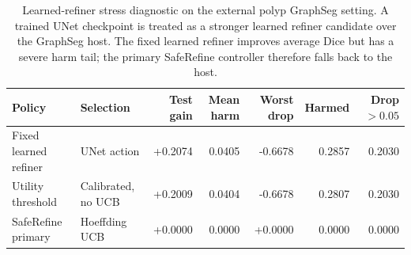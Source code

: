 \begin{table}[t]
\centering
\caption{Learned-refiner stress diagnostic on the external polyp GraphSeg setting. A trained UNet checkpoint is treated as a stronger learned refiner candidate over the GraphSeg host. The fixed learned refiner improves average Dice but has a severe harm tail; the primary SafeRefine controller therefore falls back to the host.}
\label{tab:learned_refiner_pair}
\begin{tabular}{llrrrrr}
\toprule
Policy & Selection & Test gain & Mean harm & Worst drop & Harmed & Drop$>0.05$ \\
\midrule
Fixed learned refiner & UNet action & +0.2074 & 0.0405 & -0.6678 & 0.2857 & 0.2030 \\
Utility threshold & Calibrated, no UCB & +0.2009 & 0.0404 & -0.6678 & 0.2807 & 0.2030 \\
SafeRefine primary & Hoeffding UCB & +0.0000 & 0.0000 & +0.0000 & 0.0000 & 0.0000 \\
\bottomrule
\end{tabular}
\end{table}

